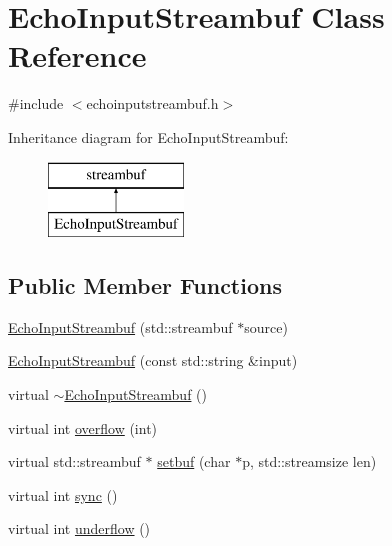 \hypertarget{classsgl_1_1EchoInputStreambuf}{}\section{Echo\+Input\+Streambuf Class Reference}
\label{classsgl_1_1EchoInputStreambuf}


{\ttfamily \#include $<$echoinputstreambuf.\+h$>$}

Inheritance diagram for Echo\+Input\+Streambuf\+:\begin{figure}[H]
\begin{center}
\leavevmode
\includegraphics[height=2.000000cm]{classsgl_1_1EchoInputStreambuf}
\end{center}
\end{figure}
\subsection*{Public Member Functions}
\begin{DoxyCompactItemize}
\item 
\mbox{\hyperlink{classsgl_1_1EchoInputStreambuf_a708155d9f25b8e73432c541e5a7d0f07}{Echo\+Input\+Streambuf}} (std\+::streambuf $\ast$source)
\item 
\mbox{\hyperlink{classsgl_1_1EchoInputStreambuf_abf31cdf423a80fa9a3b5c65dd20378fd}{Echo\+Input\+Streambuf}} (const std\+::string \&input)
\item 
virtual \mbox{\hyperlink{classsgl_1_1EchoInputStreambuf_abbb0d282d20bed4b6b5d8c700c312344}{$\sim$\+Echo\+Input\+Streambuf}} ()
\item 
virtual int \mbox{\hyperlink{classsgl_1_1EchoInputStreambuf_a71cbc6b1ec560d3788dac4c02e9328da}{overflow}} (int)
\item 
virtual std\+::streambuf $\ast$ \mbox{\hyperlink{classsgl_1_1EchoInputStreambuf_adab87f356f20a3d6ac970facd081f967}{setbuf}} (char $\ast$p, std\+::streamsize len)
\item 
virtual int \mbox{\hyperlink{classsgl_1_1EchoInputStreambuf_a810a727ce5554d3178e17b6bc55025dd}{sync}} ()
\item 
virtual int \mbox{\hyperlink{classsgl_1_1EchoInputStreambuf_aeb6918bd44153b257e097e2d2ef370ef}{underflow}} ()
\end{DoxyCompactItemize}


